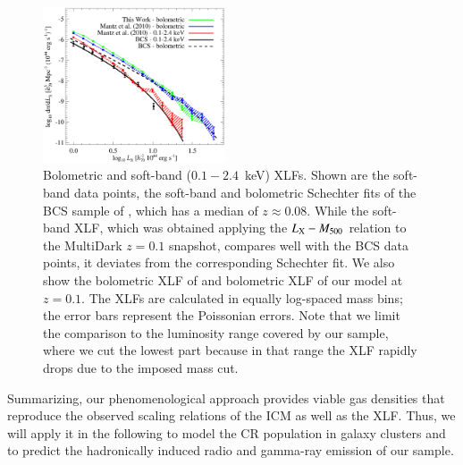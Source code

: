 \documentclass[useAMS,usenatbib]{mn2e}
\begin{document}
\begin{figure} 
\centering
\includegraphics[width=0.48\textwidth]{figures/xlf.eps}
\caption{Bolometric and soft-band ($0.1-2.4$~keV) XLFs. Shown are the soft-band
  data points, the soft-band and bolometric Schechter fits of the BCS sample of
  \protect\cite{1997ApJ...479L.101E}, which has a median of $z \approx 0.08$.  While the
  soft-band XLF, which was obtained applying the \protect\cite{2010MNRAS.406.1773M}
  $L_{{\mathrm{X}}}-M_{500}$ relation to the MultiDark $z = 0.1$ snapshot, compares
  well with the BCS data points, it deviates from the corresponding Schechter
  fit. We also show the bolometric XLF of \protect\cite{2010MNRAS.406.1773M} and
  bolometric XLF of our model at $z=0.1$. The XLFs are calculated in equally
  log-spaced mass bins; the error bars represent the Poissonian errors. Note
  that we limit the comparison to the luminosity range covered by our sample,
  where we cut the lowest part because in that range the XLF rapidly drops due
  to the imposed mass cut.}
\label{fig:XLF}
\end{figure}

Summarizing, our phenomenological approach provides viable gas densities that
reproduce the observed scaling relations of the ICM as well as the XLF. Thus, we
will apply it in the following to model the CR population in galaxy clusters and
to predict the hadronically induced radio and gamma-ray emission of our sample.


\end{document}
